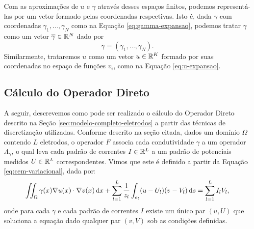 Com as aproximações de $u$ e $\gamma$ através desses espaços finitos, podemos representá-las por um vetor formado pelas coordenadas respectivas. Isto é, dada $\gamma$ com coordenadas $\gamma_1, \dots, \gamma_N$ como na Equação \eqref{eq:gamma-expansao}, podemos tratar $\gamma$ como um vetor $\overline \gamma \in \mathbb{R}^N$ dado por
\begin{equation}
    \overline \gamma = \left( \gamma_1, \dots, \gamma_N \right).
\end{equation}
Similarmente, trataremos $u$ como um vetor $u \in \mathbb{R}^K$ formado por suas coordenadas no espaço de funções $v_i$, como na Equação \eqref{eq:u-expansao}.


\subsection{Cálculo do Operador Direto}


A seguir, descrevemos como pode ser realizado o cálculo do Operador Direto descrito na Seção \ref{sec:modelo-completo-eletrodos} a partir das técnicas de discretização utilizadas. Conforme descrito na seção citada, dados um domínio $\Omega$ contendo $L$ eletrodos, o operador $F$ associa cada condutividade $\gamma$ a um operador $\Lambda_\gamma$, o qual leva cada padrão de correntes $I \in \mathbb{R}^L$ a um padrão de potenciais medidos $U\in \mathbb{R}^L$ correspondentes. Vimos que este é definido a partir da Equação \eqref{eq:cem-variacional}, dada por:
\begin{equation*}
    \iint_\Omega \gamma (x) \nabla u(x) \cdot \nabla v(x)\mathop{}\!\mathrm{d} x + \sum_{l=1}^L \frac{1}{z_l}\int_{e_l} (u-U_l)(v - V_l)\mathop{}\!\mathrm{d} s = \sum_{l=1}^L I_l V_l,
\end{equation*}
onde para cada $\gamma$ e cada padrão de correntes $I$ existe um único par $(u,U)$ que soluciona a equação dado qualquer par $(v,V)$ sob as condições definidas. 

